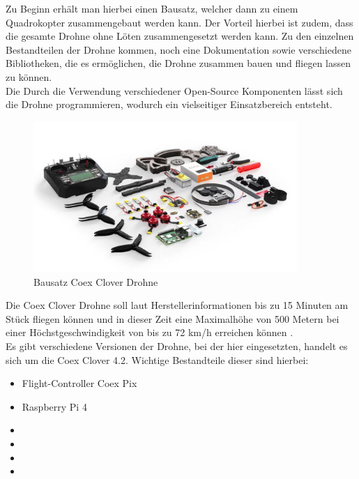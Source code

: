 Zu Beginn erhält man hierbei einen Bausatz, welcher dann zu einem Quadrokopter zusammengebaut werden kann. Der Vorteil hierbei ist zudem, dass die gesamte Drohne ohne Löten zusammengesetzt werden kann. Zu den einzelnen Bestandteilen der Drohne kommen, noch eine Dokumentation sowie verschiedene Bibliotheken, die es ermöglichen, die Drohne zusammen bauen und fliegen lassen zu können. \\
Die 
Durch die Verwendung verschiedener Open-Source Komponenten lässt sich die Drohne programmieren, wodurch ein vielseitiger Einsatzbereich entsteht.\\

\begin{figure}[htpb]
    \centering
    \includegraphics[width=10cm,keepaspectratio,angle=0]{images/coex_clover_kit.jpg}
    \caption[Bausatz Coex Clover Drohne]{\label{img coex_clover_kit} Bausatz Coex Clover Drohne \cite{img_coex_clover_kit}}
\end{figure}

Die Coex Clover Drohne soll laut Herstellerinformationen bis zu 15 Minuten am Stück fliegen können und in dieser Zeit eine Maximalhöhe von 500 Metern bei einer Höchstgeschwindigkeit von bis zu 72 km/h erreichen können \cite[vgl.][]{coex_clover}.\\

Es gibt verschiedene Versionen der Drohne, bei der hier eingesetzten, handelt es sich um die Coex Clover 4.2.
Wichtige Bestandteile dieser sind hierbei:
\begin{center}
    \begin{itemize}
        \item Flight-Controller Coex Pix
        \item Raspberry Pi 4
        \item 
        \item 
        \item 
        \item 
    \end{itemize}
    \label{lst:coex-components}
\end{center}

